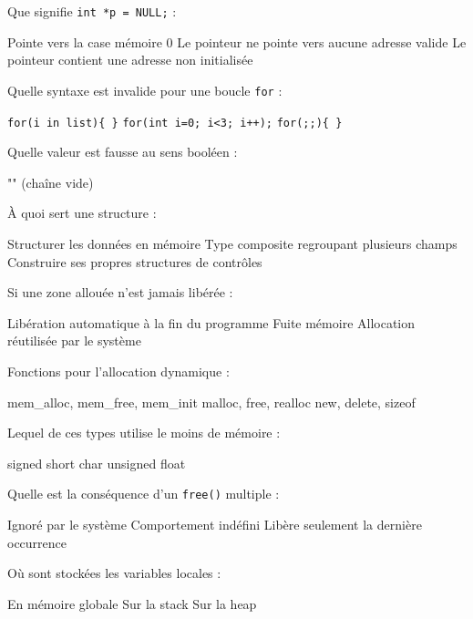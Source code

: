 \documentclass[12pt, a4paper]{exam}
\begin{document}
\begin{questions}
\question Que signifie \texttt{int *p = NULL;} :
\begin{checkboxes}
 \choice Pointe vers la case mémoire 0
 \CorrectChoice Le pointeur ne pointe vers aucune adresse valide
 \choice Le pointeur contient une adresse non initialisée
\end{checkboxes}

\pagebreak{}
\question Quelle syntaxe est invalide pour une boucle \texttt{for} :
\begin{checkboxes}
 \CorrectChoice \texttt{for(i in list)\{ \}}
 \choice \texttt{for(int i=0; i<3; i++);}
 \choice \texttt{for(;;)\{ \}}
\end{checkboxes}

\question Quelle valeur est fausse au sens booléen :
\begin{checkboxes}
 \choice "" (chaîne vide)
\end{checkboxes}

\question À quoi sert une structure :
\begin{checkboxes}
 \CorrectChoice Structurer les données en mémoire
 \CorrectChoice Type composite regroupant plusieurs champs
 \choice Construire ses propres structures de contrôles
\end{checkboxes}

\question Si une zone allouée n’est jamais libérée :
\begin{checkboxes}
 \choice Libération automatique à la fin du programme
 \CorrectChoice Fuite mémoire
 \choice Allocation réutilisée par le système
\end{checkboxes}

\question Fonctions pour l’allocation dynamique :
\begin{checkboxes}
 \choice mem\_alloc, mem\_free, mem\_init
 \CorrectChoice malloc, free, realloc
 \choice new, delete, sizeof
\end{checkboxes}

\question Lequel de ces types utilise le moins de mémoire :
\begin{checkboxes}
 \choice signed short
 \CorrectChoice char
 \choice unsigned float
\end{checkboxes}

\question Quelle est la conséquence d’un \texttt{free()} multiple :
\begin{checkboxes}
 \choice Ignoré par le système
 \CorrectChoice Comportement indéfini
 \choice Libère seulement la dernière occurrence
\end{checkboxes}

\question Où sont stockées les variables locales :
\begin{checkboxes}
 \choice En mémoire globale
 \CorrectChoice Sur la stack
 \choice Sur la heap
\end{checkboxes}

\end{questions}
\end{document}
